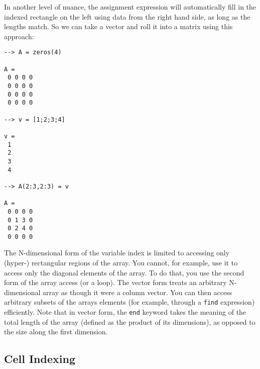 In another level of nuance, the assignment expression will
automatically fill in the indexed rectangle on the left using
data from the right hand side, as long as the lengths match.
So we can take a vector and roll it into a matrix using this
approach:
\begin{verbatim}
--> A = zeros(4)

A = 
 0 0 0 0 
 0 0 0 0 
 0 0 0 0 
 0 0 0 0 

--> v = [1;2;3;4]

v = 
 1 
 2 
 3 
 4 

--> A(2:3,2:3) = v

A = 
 0 0 0 0 
 0 1 3 0 
 0 2 4 0 
 0 0 0 0 
\end{verbatim}

The N-dimensional form of the variable index is limited
to accessing only (hyper-) rectangular regions of the 
array.  You cannot, for example, use it to access only
the diagonal elements of the array.  To do that, you use
the second form of the array access (or a loop).  The
vector form treats an arbitrary N-dimensional array as though
it were a column vector.  You can then access arbitrary 
subsets of the arrays elements (for example, through a \verb|find|
expression) efficiently.  Note that in vector form, the \verb|end|
keyword takes the meaning of the total length of the array
(defined as the product of its dimensions), as opposed to the
size along the first dimension.
\subsection{Cell Indexing}

